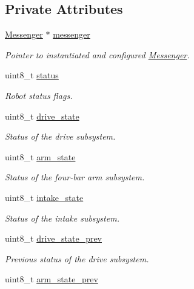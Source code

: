\subsection*{Private Attributes}
\begin{DoxyCompactItemize}
\item 
\hyperlink{class_messenger}{Messenger} $\ast$ \hyperlink{class_threaded_robot_a7ff65f6f18c5d3a9d5823e0a00b46c9f}{messenger}
\begin{DoxyCompactList}\small\item\em Pointer to instantiated and configured \hyperlink{class_messenger}{Messenger}. \end{DoxyCompactList}\item 
uint8\+\_\+t \hyperlink{class_threaded_robot_a10f3a9d1b27ca8e7a1ada75323c75879}{status}
\begin{DoxyCompactList}\small\item\em Robot status flags. \end{DoxyCompactList}\item 
uint8\+\_\+t \hyperlink{class_threaded_robot_a8cc4fc4f00ff6566604f9499d427698a}{drive\+\_\+state}
\begin{DoxyCompactList}\small\item\em Status of the drive subsystem. \end{DoxyCompactList}\item 
uint8\+\_\+t \hyperlink{class_threaded_robot_a19026abe96d44213f7e8b3983be2d968}{arm\+\_\+state}
\begin{DoxyCompactList}\small\item\em Status of the four-\/bar arm subsystem. \end{DoxyCompactList}\item 
uint8\+\_\+t \hyperlink{class_threaded_robot_a832f25be64f45ff3297d3da9609a9391}{intake\+\_\+state}
\begin{DoxyCompactList}\small\item\em Status of the intake subsystem. \end{DoxyCompactList}\item 
uint8\+\_\+t \hyperlink{class_threaded_robot_a4a4a3eab10c962150bc5194f22d10496}{drive\+\_\+state\+\_\+prev}
\begin{DoxyCompactList}\small\item\em Previous status of the drive subsystem. \end{DoxyCompactList}\item 
uint8\+\_\+t \hyperlink{class_threaded_robot_a77a621d5f607ff296ceac51c831a3258}{arm\+\_\+state\+\_\+prev}

\end{DoxyCompactItemize}

